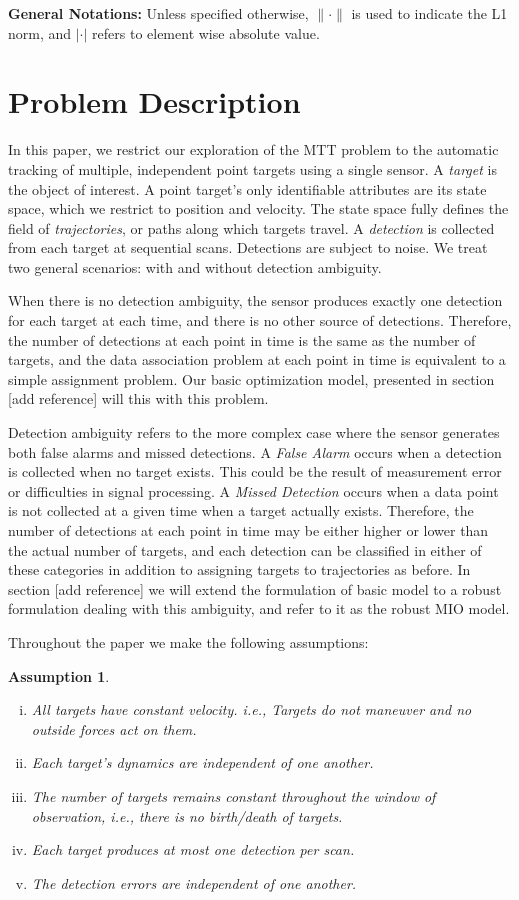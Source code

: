 \documentclass[journal]{IEEEtran}
\newtheorem{assumption}{Assumption}
\begin{document}
{\bf General Notations:}
Unless specified otherwise, $\|\cdot\|$ is used to indicate the L1 norm, and $|\cdot|$ refers to element wise absolute value.

\section{Problem Description}
In this paper, we restrict our exploration of the MTT problem to the automatic tracking of multiple, independent point targets using a single sensor. A \textit{target} is the object of interest. A point target's only identifiable attributes are its state space, which we restrict to position and velocity. The state space fully defines the field of \textit{trajectories}, or paths along which targets travel. A \textit{detection} is collected from each target at sequential scans. Detections are subject to noise. We treat two general scenarios: with and without detection ambiguity. 

When there is no detection ambiguity, the sensor produces exactly one detection for each target at each time, and there is no other source of detections. Therefore, the number of detections at each point in time is the same as the number of targets, and the data association problem at each point in time is equivalent to a simple assignment problem. Our basic optimization model, presented in section [add reference] will this with this problem. 

Detection ambiguity refers to the more complex case where the sensor generates both false alarms and missed detections. A \textit{False Alarm} occurs when a detection is collected when no target exists. This could be the result of measurement error or difficulties in signal processing. A \textit{Missed Detection} occurs when a data point is not collected at a given time when a target actually exists. Therefore, the number of detections at each point in time may be either higher or lower than the actual number of targets, and each detection can be classified in either of these categories in addition to assigning targets to trajectories as before. In section [add reference] we will extend the formulation of basic model to a robust formulation dealing with this ambiguity, and refer to it as the robust MIO model.

Throughout the paper we make the following assumptions:
\begin{assumption}\label{ass:general_assumption}
\begin{enumerate}[(i)]
\item{}All targets have constant velocity. \textit{i.e.}, Targets do not maneuver and no outside forces act on them.
\item Each target's dynamics are independent of one another.
\item The number of targets remains constant throughout the window of observation, \textit{i.e.}, there is no birth/death of targets.
\item Each target produces at most one detection per scan.
\item The detection errors are independent of one another.
\end{enumerate}
\end{assumption}
\end{document}
